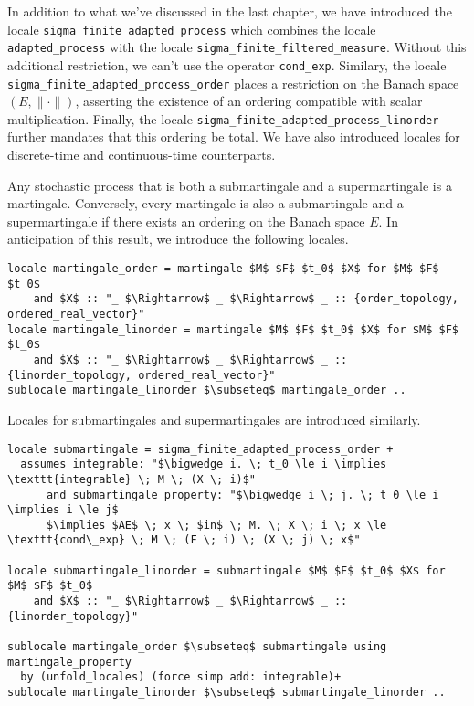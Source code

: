 \begin{remark}
 In addition to what we've discussed in the last chapter, we have introduced the locale \texttt{sigma\_finite\_adapted\_process} which combines the locale \texttt{adapted\_process} with the locale \texttt{sigma\_finite\_filtered\_measure}. Without this additional restriction, we can't use the operator \texttt{cond\_exp}. Similary, the locale \texttt{sigma\_finite\_adapted\_process\-\_order} places a restriction on the Banach space $(E, \lVert \cdot \rVert)$, asserting the existence of an ordering compatible with scalar multiplication. Finally, the locale \texttt{sigma\_finite\_adapted\-\_process\_linorder} further mandates that this ordering be total. We have also introduced locales for discrete-time and continuous-time counterparts.
\end{remark}

Any stochastic process that is both a submartingale and a supermartingale is a martingale. Conversely, every martingale is also a submartingale and a supermartingale if there exists an ordering on the Banach space $E$. In anticipation of this result, we introduce the following locales.

\begin{isadefinition}
{\small
\begin{lstlisting}[style=isabelle]
locale martingale_order = martingale $M$ $F$ $t_0$ $X$ for $M$ $F$ $t_0$
	and $X$ :: "_ $\Rightarrow$ _ $\Rightarrow$ _ :: {order_topology, ordered_real_vector}"
locale martingale_linorder = martingale $M$ $F$ $t_0$ $X$ for $M$ $F$ $t_0$
	and $X$ :: "_ $\Rightarrow$ _ $\Rightarrow$ _ :: {linorder_topology, ordered_real_vector}"
sublocale martingale_linorder $\subseteq$ martingale_order ..
\end{lstlisting}
}
\end{isadefinition}

Locales for submartingales and supermartingales are introduced similarly.

\begin{isadefinition}
{\small
\begin{lstlisting}[style=isabelle]
locale submartingale = sigma_finite_adapted_process_order +
  assumes integrable: "$\bigwedge i. \; t_0 \le i \implies \texttt{integrable} \; M \; (X \; i)$"
      and submartingale_property: "$\bigwedge i \; j. \; t_0 \le i \implies i \le j$
	  $\implies $AE$ \; x \; $in$ \; M. \; X \; i \; x \le \texttt{cond\_exp} \; M \; (F \; i) \; (X \; j) \; x$"
	  
locale submartingale_linorder = submartingale $M$ $F$ $t_0$ $X$ for $M$ $F$ $t_0$ 
	and $X$ :: "_ $\Rightarrow$ _ $\Rightarrow$ _ :: {linorder_topology}"

sublocale martingale_order $\subseteq$ submartingale using martingale_property
  by (unfold_locales) (force simp add: integrable)+
sublocale martingale_linorder $\subseteq$ submartingale_linorder ..
\end{lstlisting}
}
\end{isadefinition}

